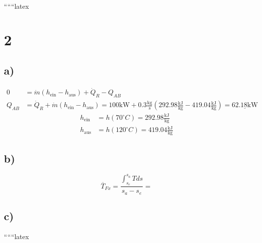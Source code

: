 
``````latex


\section*{2}
\subsection*{a)}
\begin{align*}
0 &= \dot{m} (h_{\text{ein}} - h_{\text{aus}}) + \dot{Q}_R - Q_{AB} \\
Q_{AB} &= \dot{Q}_R + \dot{m} (h_{\text{ein}} - h_{\text{aus}}) = 100 \text{kW} + 0.3 \frac{\text{kg}}{\text{s}} (292.98 \frac{\text{kJ}}{\text{kg}} - 419.04 \frac{\text{kJ}}{\text{kg}}) = \underline{62.18 \text{kW}}
\end{align*}
\begin{align*}
h_{\text{ein}} &= h(70^\circ C) = 292.98 \frac{\text{kJ}}{\text{kg}} \\
h_{\text{aus}} &= h(120^\circ C) = 419.04 \frac{\text{kJ}}{\text{kg}}
\end{align*}

\subsection*{b)}
\[
\overline{T}_{Fx} = \frac{\int_{s_e}^{s_a} T ds}{s_a - s_e} = \boxed{}
\]

\subsection*{c)}
``````latex


